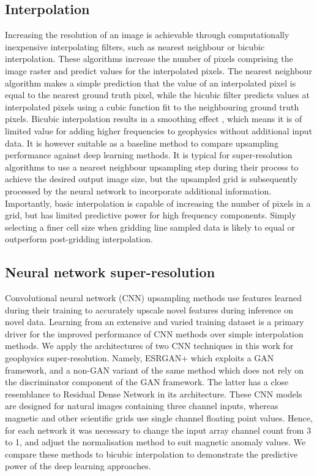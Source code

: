 \subsection{Interpolation}
Increasing the resolution of an image is achievable through computationally inexpensive interpolating filters, such as nearest neighbour or bicubic interpolation.
These algorithms increase the number of pixels comprising the image raster and predict values for the interpolated pixels.
The nearest neighbour algorithm makes a simple prediction that the value of an interpolated pixel is equal to the nearest ground truth pixel, while the bicubic filter predicts values at interpolated pixels using a cubic function fit to the neighbouring ground truth pixels.
Bicubic interpolation results in a smoothing effect \parencite{keysCubicConvolutionInterpolation1981}, which means it is of limited value for adding higher frequencies to geophysics without additional input data.
It is however suitable as a baseline method to compare upsampling performance against deep learning methods.
It is typical for super-resolution algorithms to use a nearest neighbour upsampling step during their process to achieve the desired output image size, but the upsampled grid is subsequently processed by the neural network to incorporate additional information.
Importantly, basic interpolation is capable of increasing the number of pixels in a grid, but has limited predictive power for high frequency components.
Simply selecting a finer cell size when gridding line sampled data is likely to equal or outperform post-gridding interpolation.

\subsection{Neural network super-resolution}
\label{sec:nnsr}
Convolutional neural network (CNN) upsampling methods use features learned during their training to accurately upscale novel features during inference on novel data.
Learning from an extensive and varied training dataset is a primary driver for the improved performance of CNN methods over simple interpolation methods.
We apply the architectures of two CNN techniques in this work for geophysics super-resolution.
Namely, ESRGAN+ \parencite{rakotonirinaESRGANFurtherImproving2020} which exploits a GAN framework, and a non-GAN variant of the same method which does not rely on the discriminator component of the GAN framework.
The latter has a close resemblance to Residual Dense Network \parencite{zhangResidualDenseNetwork2018} in its architecture.
These CNN models are designed for natural images containing three channel inputs, whereas magnetic and other scientific grids use single channel floating point values.
Hence, for each network it was necessary to change the input array channel count from 3 to 1, and adjust the normalisation method to suit magnetic anomaly values.
We compare these methods to bicubic interpolation to demonstrate the predictive power of the deep learning approaches.

